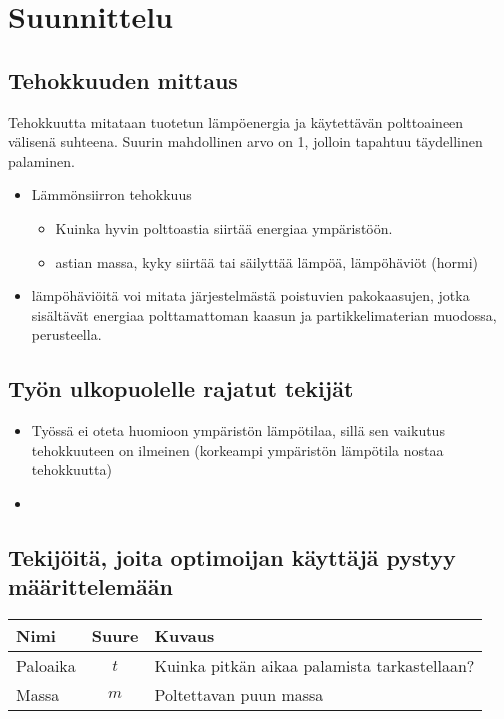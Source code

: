 \section{Suunnittelu}

\subsection{Tehokkuuden mittaus}
Tehokkuutta mitataan tuotetun lämpöenergia ja käytettävän polttoaineen välisenä
suhteena. Suurin mahdollinen arvo on 1, jolloin tapahtuu täydellinen palaminen.

\begin{itemize}
	\item Lämmönsiirron tehokkuus
		\begin{itemize}
			\item Kuinka hyvin polttoastia siirtää energiaa ympäristöön.
			\item astian massa, kyky siirtää tai säilyttää lämpöä, lämpöhäviöt (hormi)
		\end{itemize}
	\item lämpöhäviöitä voi mitata järjestelmästä poistuvien pakokaasujen, jotka
	sisältävät energiaa polttamattoman kaasun ja partikkelimaterian muodossa, perusteella.
\end{itemize}

\subsection{Työn ulkopuolelle rajatut tekijät}
\begin{itemize}
\item Työssä ei oteta huomioon ympäristön lämpötilaa,
sillä sen vaikutus tehokkuuteen on ilmeinen (korkeampi ympäristön lämpötila nostaa tehokkuutta)
\item
\end{itemize}

\subsection{Tekijöitä, joita optimoijan käyttäjä pystyy määrittelemään}
\begin{tabular*}{\textwidth}{lcl}
	\toprule
	\bf Nimi & \bf Suure & \bf Kuvaus \\
	\midrule
	Paloaika & \(t\) & Kuinka pitkän aikaa palamista tarkastellaan? \\
	Massa & \(m\) & Poltettavan puun massa \\
	\bottomrule
\end{tabular*}
